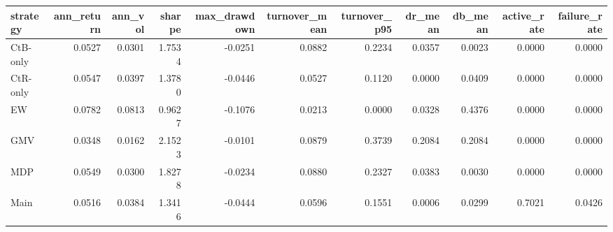 \begin{tabular}{lrrrrrrrrrr}
\toprule
strategy & ann_return & ann_vol & sharpe & max_drawdown & turnover_mean & turnover_p95 & dr_mean & db_mean & active_rate & failure_rate \\
\midrule
CtB-only & 0.0527 & 0.0301 & 1.7534 & -0.0251 & 0.0882 & 0.2234 & 0.0357 & 0.0023 & 0.0000 & 0.0000 \\
CtR-only & 0.0547 & 0.0397 & 1.3780 & -0.0446 & 0.0527 & 0.1120 & 0.0000 & 0.0409 & 0.0000 & 0.0000 \\
EW & 0.0782 & 0.0813 & 0.9627 & -0.1076 & 0.0213 & 0.0000 & 0.0328 & 0.4376 & 0.0000 & 0.0000 \\
GMV & 0.0348 & 0.0162 & 2.1523 & -0.0101 & 0.0879 & 0.3739 & 0.2084 & 0.2084 & 0.0000 & 0.0000 \\
MDP & 0.0549 & 0.0300 & 1.8278 & -0.0234 & 0.0880 & 0.2327 & 0.0383 & 0.0030 & 0.0000 & 0.0000 \\
Main & 0.0516 & 0.0384 & 1.3416 & -0.0444 & 0.0596 & 0.1551 & 0.0006 & 0.0299 & 0.7021 & 0.0426 \\
\bottomrule
\end{tabular}
